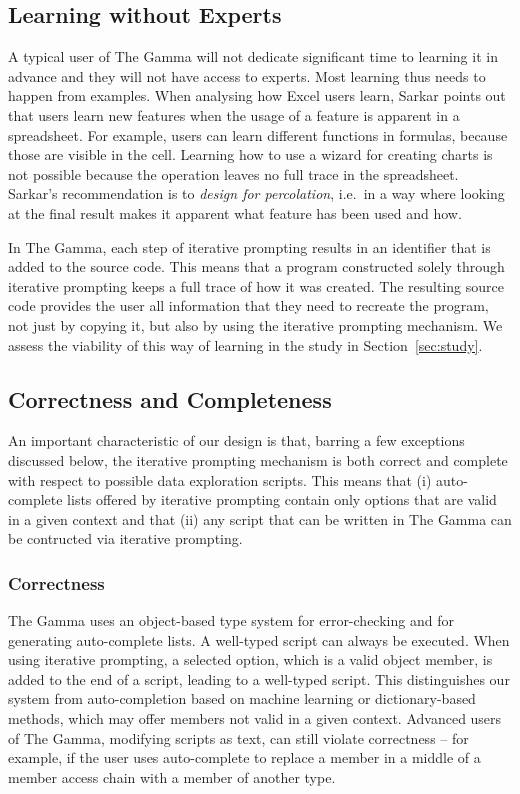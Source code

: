 \documentclass[manuscript,review,anonymous]{acmart}
\begin{document}
\subsection{Learning without Experts}
\label{sec:design-expert}

A typical user of The Gamma will not dedicate significant time to learning it in advance and
they will not have access to experts. Most learning thus needs to happen from examples.
When analysing how Excel users learn, Sarkar \cite{learning} points out that users learn new
features when the usage of a feature is apparent in a spreadsheet. For example, users can learn
different functions in formulas, because those are visible in the cell. Learning how to use a
wizard for creating charts is not possible because the operation leaves no full trace in the
spreadsheet. Sarkar's recommendation is to \emph{design for percolation},
i.e.~in a way where looking at the final result makes it apparent what feature has been used and how.

In The Gamma, each step of iterative prompting results in an identifier that is
added to the source code. This means that a program constructed solely through iterative prompting
keeps a full trace of how it was created. The resulting source code provides the user all
information that they need to recreate the program, not just by copying it, but also by using the
iterative prompting mechanism. We assess the viability of this way of learning in the study in
Section~\ref{sec:study}.

\subsection{Correctness and Completeness}
\label{sec:design-cc}

An important characteristic of our design is that, barring a few exceptions discussed below, the iterative
prompting mechanism is both correct and complete with respect to possible data exploration scripts.
This means that (i) auto-complete lists offered by iterative prompting contain
only options that are valid in a given context and that (ii) any script that can be written
in The Gamma can be contructed via iterative prompting.

\subsubsection*{Correctness} The Gamma uses an object-based type system for error-checking and for
generating auto-complete lists. A well-typed script can always be executed. When using iterative
prompting, a selected option, which is a valid object member, is added to the end of a script,
leading to a well-typed script. This distinguishes our system from auto-completion based on machine
learning or dictionary-based methods, which may offer members not valid in a given context. Advanced
users of The Gamma, modifying scripts as text, can still violate correctness -- for example, if the
user uses auto-complete to replace a member in a middle of a member access chain with a member of another type.
\end{document}
